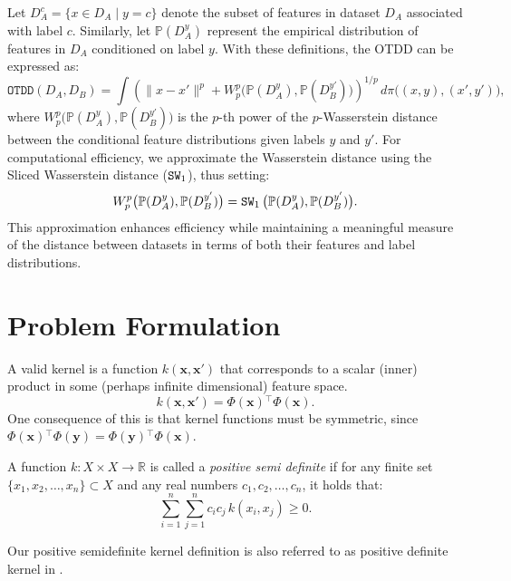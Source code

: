 Let $D_A^c = \{ x \in D_A \mid y = c \}$ denote the subset of features in dataset $D_A$ associated with label $c$. Similarly, let $\mathbb{P}(D_A^y)$ represent the empirical distribution of features in $D_A$ conditioned on label $y$. With these definitions, the OTDD can be expressed as:
\[
\texttt{OTDD}(D_A, D_B) = \int \left( \| x - x' \|^p + W_p^p\big( \mathbb{P}(D_A^y), \mathbb{P}(D_B^{y'}) \big) \right)^{1/p} \, d\pi\big( (x, y), (x', y') \big),
\]
where $W_p^p\big( \mathbb{P}(D_A^y), \mathbb{P}(D_B^{y'}) \big)$ is the $p$-th power of the $p$-Wasserstein distance between the conditional feature distributions given labels $y$ and $y'$. For computational efficiency, we approximate the Wasserstein distance using the Sliced Wasserstein distance ($\operatorname{\texttt{SW}}_1$), thus setting:
\[
W_p^p\big( \mathbb{P}(D_A^y), \mathbb{P}(D_B^{y'}) \big) = \operatorname{\texttt{SW}}_1\big( \mathbb{P}(D_A^y), \mathbb{P}(D_B^{y'}) \big).
\]
This approximation enhances efficiency while maintaining a meaningful measure of the distance between datasets in terms of both their features and label distributions.

\section{Problem Formulation}\label{appendix:pos}

\begin{definition}
A valid kernel is a function $k(\mathbf{x},\mathbf{x}')$ that corresponds to a scalar (inner) product in some (perhaps infinite dimensional) feature space.
\[
k(\mathbf{x}, \mathbf{x'}) = \Phi(\mathbf{x}){}^{\top}\Phi(\mathbf{x}).
\]
One consequence of this is that kernel functions must be symmetric, since $\Phi(\mathbf{x}){}^{\top}\Phi(\mathbf{y}) =  \Phi(\mathbf{y}){}^{\top}\Phi(\mathbf{x})$.
\end{definition}
\begin{definition}
A function $ k: X \times X \rightarrow \mathbb{R} $ is called a \emph{positive semi definite} if for any finite set $ \{ x_1, x_2, \dots, x_n \}  \subset X $ and any real numbers $ c_1, c_2, \dots, c_n $, it holds that:
  \[
  \sum_{i=1}^{n} \sum_{j=1}^{n} c_i c_j\, k(x_i, x_j) \geq 0.
  \]
\end{definition}

Our positive semidefinite kernel definition is also referred to as positive definite kernel in \cite{Kanagawa2018GaussianPA}.

